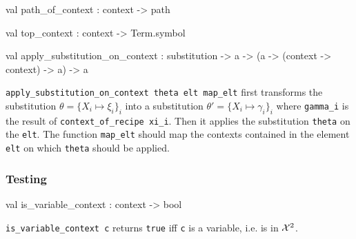 \label{val:Recipe.path-underscoreof-underscorecontext}\begin{ocamldoccode}
val path_of_context : context -> path
\end{ocamldoccode}




\label{val:Recipe.top-underscorecontext}\begin{ocamldoccode}
val top_context : context -> Term.symbol
\end{ocamldoccode}




\label{val:Recipe.apply-underscoresubstitution-underscoreon-underscorecontext}\begin{ocamldoccode}
val apply_substitution_on_context :
  substitution ->
  {\textquotesingle}a -> ({\textquotesingle}a -> (context -> context) -> {\textquotesingle}a) -> {\textquotesingle}a
\end{ocamldoccode}
\begin{ocamldocdescription}
{\tt{apply\_substitution\_on\_context theta elt map\_elt}} first transforms the substitution $\theta = \{X_i \mapsto \xi_i\}_i$
    into a substitution $\theta' = \{X_i \mapsto \gamma_i\}_i$  where {\tt{gamma\_i}} is the result of {\tt{context\_of\_recipe xi\_i}}.
    Then it applies the substitution {\tt{theta{\textquotesingle}}} on the {\tt{elt}}. The function
    {\tt{map\_elt}} should map the contexts contained in the element {\tt{elt}} on which {\tt{theta{\textquotesingle}}} should be applied.


\end{ocamldocdescription}




\subsubsection{Testing}




\label{val:Recipe.is-underscorevariable-underscorecontext}\begin{ocamldoccode}
val is_variable_context : context -> bool
\end{ocamldoccode}
\begin{ocamldocdescription}
{\tt{is\_variable\_context c}} returns {\tt{true}} iff {\tt{c}} is a variable, i.e. is in $\mathcal{X}^2$. 


\end{ocamldocdescription}




